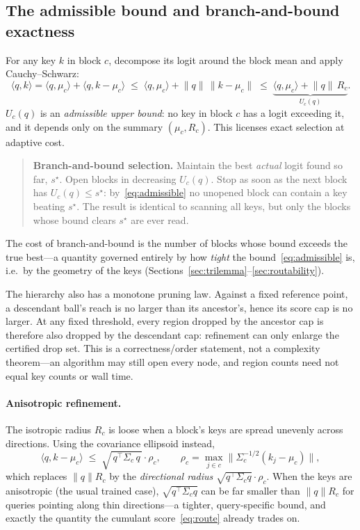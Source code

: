 \documentclass[11pt]{article}
\numberwithin{equation}{section}
\newcommand{\inner}[2]{\langle #1, #2\rangle}
\begin{document}
\subsection{The admissible bound and branch-and-bound exactness}\label{sec:bnb}

For any key $k$ in block $c$, decompose its logit around the block mean and apply Cauchy--Schwarz:
\begin{equation}\label{eq:admissible}
\inner{q}{k} = \inner{q}{\mu_c} + \inner{q}{k-\mu_c}
\;\le\; \inner{q}{\mu_c} + \lVert q\rVert\,\lVert k-\mu_c\rVert
\;\le\; \underbrace{\inner{q}{\mu_c} + \lVert q\rVert\,R_c}_{\textstyle U_c(q)} .
\end{equation}
$U_c(q)$ is an \emph{admissible upper bound}: no key in block $c$ has a logit exceeding it, and it depends only
on the summary $(\mu_c,R_c)$. This licenses exact selection at adaptive cost.

\begin{quote}
\textbf{Branch-and-bound selection.} Maintain the best \emph{actual} logit found so far, $s^\star$. Open blocks
in decreasing $U_c(q)$. Stop as soon as the next block has $U_c(q)\le s^\star$: by~\eqref{eq:admissible} no
unopened block can contain a key beating $s^\star$. The result is identical to scanning all keys, but only the
blocks whose bound clears $s^\star$ are ever read.
\end{quote}

The cost of branch-and-bound is the number of blocks whose bound exceeds the true best---a quantity governed
entirely by how \emph{tight} the bound~\eqref{eq:admissible} is, i.e.\ by the geometry of the keys
(Sections~\ref{sec:trilemma}--\ref{sec:routability}).

The hierarchy also has a monotone pruning law. Against a fixed reference point, a descendant ball's reach is
no larger than its ancestor's, hence its score cap is no larger. At any fixed threshold, every region dropped
by the ancestor cap is therefore also dropped by the descendant cap: refinement can only enlarge the
certified drop set. This is a correctness/order statement, not a complexity theorem---an algorithm may still
open every node, and region counts need not equal key counts or wall time.

\paragraph{Anisotropic refinement.} The isotropic radius $R_c$ is loose when a block's keys are spread unevenly
across directions. Using the covariance ellipsoid instead,
\begin{equation}\label{eq:aniso}
\inner{q}{k-\mu_c} \;\le\; \sqrt{\,q^\top \Sigma_c\, q\,}\cdot \rho_c,\qquad
\rho_c=\max_{j\in c}\big\lVert \Sigma_c^{-1/2}(k_j-\mu_c)\big\rVert,
\end{equation}
which replaces $\lVert q\rVert R_c$ by the \emph{directional radius} $\sqrt{q^\top\Sigma_c q}\cdot\rho_c$. When
the keys are anisotropic (the usual trained case), $\sqrt{q^\top\Sigma_c q}$ can be far smaller than
$\lVert q\rVert R_c$ for queries pointing along thin directions---a tighter, query-specific bound, and exactly
the quantity the cumulant score~\eqref{eq:route} already trades on.
\end{document}
